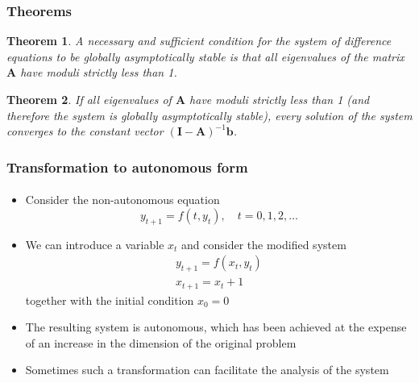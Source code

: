 \documentclass[10pt,usenames,dvipsnames]{beamer}
\theoremstyle{plain}
\newtheorem{thm}{Theorem}
\theoremstyle{definition}
\begin{document}
\begin{frame}[fragile]
\frametitle{Theorems}
\begin{thm}
	A necessary and sufficient condition for the system of difference equations to be globally asymptotically stable is that all eigenvalues of the matrix $\mathbf{A}$ have moduli strictly less than 1.
\end{thm}

\begin{thm}
	If all eigenvalues of $\mathbf{A}$ have moduli strictly less than 1 (and therefore the system is globally asymptotically stable), every solution of the system converges to the constant vector $\mathbf{(I - A)}^{-1}\mathbf{b}$.
\end{thm}
\end{frame}


\begin{frame}
	\frametitle{Transformation to autonomous form}
	\framesubtitle{}
		\begin{itemize}\itemsep1em
		\item Consider the non-autonomous equation \[ y_{t+1} = f(t, y_{t}), \quad t = 0, 1, 2, \ldots \]
		\item We can introduce a variable $ x_t $ and consider the modified system 
			\[
		\begin{array}{l}
			y_{t+1} = f(x_t, y_t)\\
			x_{t+1} = x_t + 1
		\end{array}
		\] together with the initial condition $ x_0=0 $
		\item The resulting system is autonomous, which has been achieved at the expense of an increase in the dimension of the original problem
		\item Sometimes such a transformation can facilitate the analysis of the system 
	\end{itemize}
\end{frame}
\end{document}
